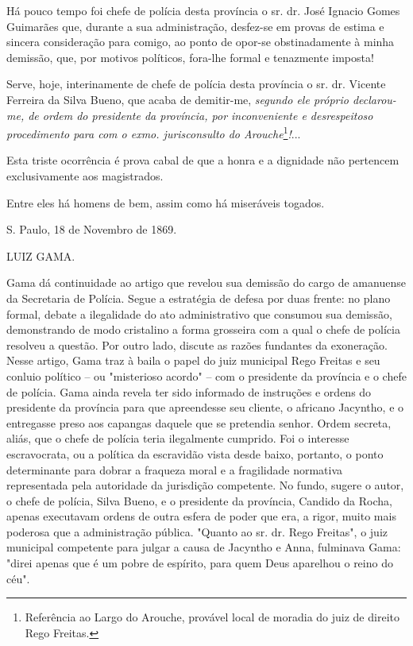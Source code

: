 Há pouco tempo foi chefe de polícia desta província o sr. dr. José
Ignacio Gomes Guimarães que, durante a sua administração, desfez-se em
provas de estima e sincera consideração para comigo, ao ponto de opor-se
obstinadamente à minha demissão, que, por motivos políticos, fora-lhe
formal e tenazmente imposta!

Serve, hoje, interinamente de chefe de polícia desta província o sr. dr.
Vicente Ferreira da Silva Bueno, que acaba de demitir-me, \emph{segundo
ele próprio declarou-me, de ordem do presidente da província, por
inconveniente e desrespeitoso procedimento para com o exmo.
jurisconsulto do Arouche}\footnote{Referência ao Largo do Arouche,
  provável local de moradia do juiz de direito Rego Freitas.}\emph{!}...

Esta triste ocorrência é
prova cabal de que a honra e a dignidade não pertencem exclusivamente
aos magistrados.

Entre eles há homens de bem, assim como há miseráveis togados.

S. Paulo, 18 de Novembro de 1869.

LUIZ GAMA.

\pagebreak
\mbox{}\vfill
\thispagestyle{empty}

{\small\noindent
Gama dá continuidade ao artigo que revelou sua demissão do cargo
de amanuense da Secretaria de Polícia. Segue a estratégia de defesa por
duas frente: no plano formal, debate a ilegalidade do ato administrativo
que consumou sua demissão, demonstrando de modo cristalino a forma
grosseira com a qual o chefe de polícia resolveu a questão. Por outro
lado, discute as razões fundantes da exoneração. Nesse artigo, Gama traz
à baila o papel do juiz municipal Rego Freitas e seu conluio político --
ou "misterioso acordo" -- com o presidente da província e o chefe de
polícia. Gama ainda revela ter sido informado de instruções e ordens do
presidente da província para que apreendesse seu cliente, o africano
Jacyntho, e o entregasse preso aos capangas daquele que se pretendia
senhor. Ordem secreta, aliás, que o chefe de polícia teria ilegalmente
cumprido. Foi o interesse escravocrata, ou a política da escravidão
vista desde baixo, portanto, o ponto determinante para dobrar a fraqueza
moral e a fragilidade normativa representada pela autoridade da
jurisdição competente. No fundo, sugere o autor, o chefe de polícia,
Silva Bueno, e o presidente da província, Candido da Rocha, apenas
executavam ordens de outra esfera de poder que era, a rigor, muito mais
poderosa que a administração pública. "Quanto ao sr. dr. Rego Freitas",
o juiz municipal competente para julgar a causa de Jacyntho e Anna,
fulminava Gama: "direi apenas que é um pobre de espírito, para quem Deus
aparelhou o reino do céu". }

